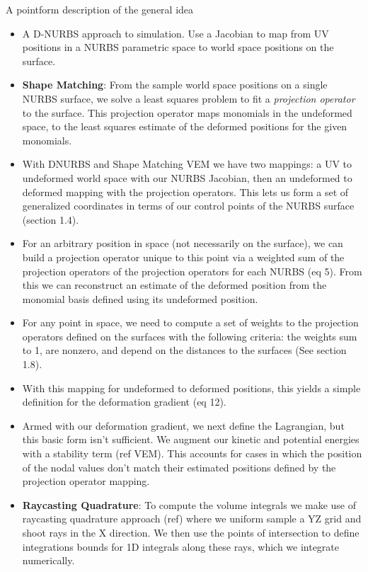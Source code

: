 \documentclass[sigconf]{acmart}
\begin{document}
A pointform description of the general idea
\begin{itemize}
	\item A D-NURBS approach to simulation. Use a Jacobian to map from UV positions in a NURBS parametric space to world space positions on the surface. 
	\item \textbf{Shape Matching}: From the sample world space positions on a single NURBS surface, we solve a least squares problem to fit a \textit{projection operator} to the surface. This projection operator maps monomials in the undeformed space, to the least squares estimate of the deformed positions for the given monomials.
	\item With DNURBS and Shape Matching VEM we have two mappings: a UV to undeformed world space with our NURBS Jacobian, then an undeformed to deformed mapping with the projection operators. This lets us form a set of generalized coordinates in terms of our control points of the NURBS surface (section 1.4).
	\item For an arbitrary position in space (not necessarily on the surface), we can build a projection operator unique to this point via a weighted sum of the projection operators of the projection operators for each NURBS (eq 5). From this we can reconstruct an estimate of the deformed position from the monomial basis defined using its undeformed position.
	\item For any point in space, we need to compute a set of weights to the projection operators defined on the surfaces with the following criteria: the weights sum to 1, are nonzero, and depend on the distances to the surfaces (See section 1.8).
	\item With this mapping for undeformed to deformed positions, this yields a simple definition for the deformation gradient (eq 12).
	\item Armed with our deformation gradient, we next define the Lagrangian, but this basic form isn't sufficient. We augment our kinetic and potential energies with a stability term (ref VEM). This accounts for cases in which the position of the nodal values don't match their estimated positions defined by the projection operator mapping.
	\item \textbf{Raycasting Quadrature}: To compute the volume integrals we make use of raycasting quadrature approach (ref) where we uniform sample a YZ grid and shoot rays in the X direction. We then use the points of intersection to define integrations bounds for 1D integrals along these rays, which we integrate numerically.

\end{itemize}
\end{document}
